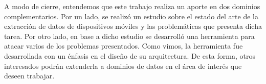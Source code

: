 A modo de cierre, entendemos que este trabajo realiza un aporte en dos dominios complementarios. Por un lado, se realizó un estudio sobre el estado del arte de la extracción de datos de dispositivos móviles y las problemáticas que presenta dicha tarea. Por otro lado, en base a dicho estudio se desarrolló una herramienta para atacar varios de los problemas presentados. Como vimos, la herramienta fue desarrollada con un énfasis en el diseño de su arquitectura. De esta forma, otros interesados podrán extenderla a dominios de datos en el área de interés que deseen trabajar.
